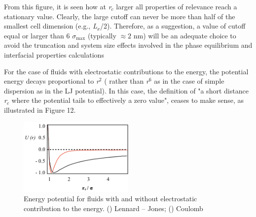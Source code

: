 \documentclass[9pt,bestpractices]{livecoms}
\begin{document}
From this figure, it is seen how at  \textit{r}$_{c}$ larger all properties of
relevance reach a stationary value. Clearly, the large cutoff can never be more
than half of the smallest cell dimension (e.g., \textit{L}$_{x}$/2).
Therefore, as a suggestion, a value of cutoff equal or larger than
6 ${\sigma}$$_{\mathrm{max}}$ (typically $\approx 2$ nm) will be an adequate choice to avoid the
truncation and system size effects involved in the phase equilibrium and
interfacial properties calculations

For the case of fluids with electrostatic contributions to the energy, the
potential energy decays proportional to \textit{r}$^{2}$ ( rather than
\textit{r}$^{6}$ as in the case of simple dispersion as in the LJ potential).
In this case, the definition of "a short distance \textit{r}$_{c}$ where the
potential tails to effectively a zero value", ceases to make sense, as
illustrated in Figure 12. 

\begin{figure}
\includegraphics[width=0.5\textwidth]{gfx/image49.png}
\caption{Energy potential for fluids with and without electrostatic contribution to the energy. (\textcolor{color-3}{\textemdash}) Lennard -- Jones; (\textemdash) Coulomb}
\label{fig:6}
\end{figure}
\end{document}
